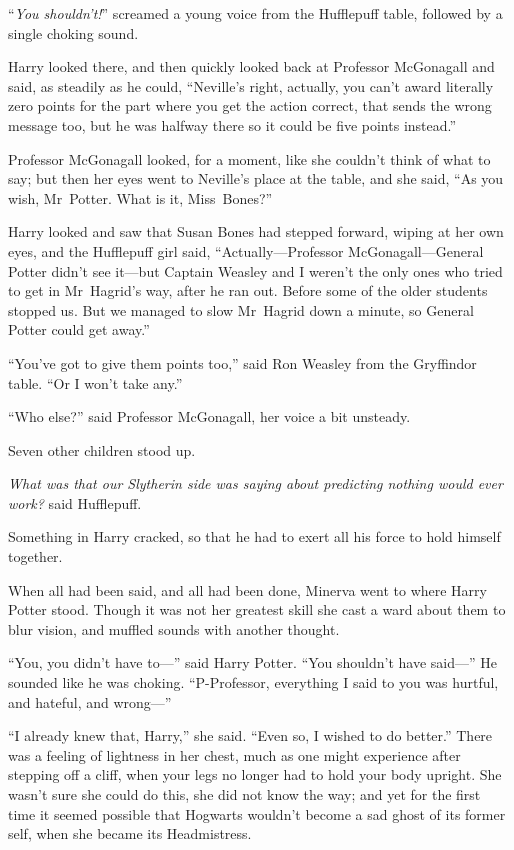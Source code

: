 “\emph{You shouldn’t!}” screamed a young voice from the Hufflepuff table, followed by a single choking sound.

Harry looked there, and then quickly looked back at Professor McGonagall and said, as steadily as he could, “Neville’s right, actually, you can’t award literally zero points for the part where you get the action correct, that sends the wrong message too, but he was halfway there so it could be five points instead.”

Professor McGonagall looked, for a moment, like she couldn’t think of what to say; but then her eyes went to Neville’s place at the table, and she said, “As you wish, Mr~Potter. What is it, Miss~Bones?”

Harry looked and saw that Susan Bones had stepped forward, wiping at her own eyes, and the Hufflepuff girl said, “Actually—Professor McGonagall—General Potter didn’t see it—but Captain Weasley and I weren’t the only ones who tried to get in Mr~Hagrid’s way, after he ran out. Before some of the older students stopped us. But we managed to slow Mr~Hagrid down a minute, so General Potter could get away.”

“You’ve got to give them points too,” said Ron Weasley from the Gryffindor table. “Or I won’t take any.”

“Who else?” said Professor McGonagall, her voice a bit unsteady.

Seven other children stood up.

\emph{What was that our Slytherin side was saying about predicting nothing would ever work?} said Hufflepuff.

Something in Harry cracked, so that he had to exert all his force to hold himself together.

\later

When all had been said, and all had been done, Minerva went to where Harry Potter stood. Though it was not her greatest skill she cast a ward about them to blur vision, and muffled sounds with another thought.

“You, you didn’t have to—” said Harry Potter. “You shouldn’t have said—” He sounded like he was choking. “P-Professor, everything I said to you was hurtful, and hateful, and wrong—”

“I already knew that, Harry,” she said. “Even so, I wished to do better.” There was a feeling of lightness in her chest, much as one might experience after stepping off a cliff, when your legs no longer had to hold your body upright. She wasn’t sure she could do this, she did not know the way; and yet for the first time it seemed possible that Hogwarts wouldn’t become a sad ghost of its former self, when she became its Headmistress.

